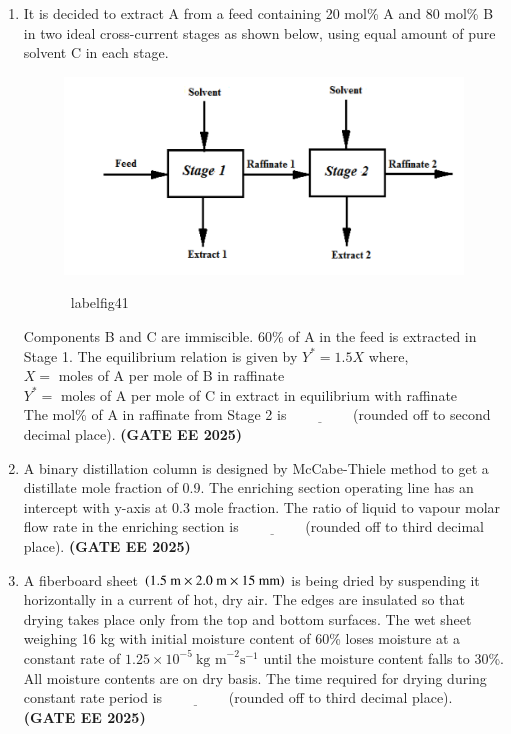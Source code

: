 \documentclass[journal,12pt,onecolumn]{IEEEtran}
\theoremstyle{remark}
\begin{document}
\begin{enumerate}
\item It is decided to extract A from a feed containing 20 mol\% A and 80 mol\% B in two ideal cross-current stages as shown below, using equal amount of pure solvent C in each stage.
	\begin{figure}
\begin{center}
\includegraphics[width=0.8\columnwidth]{figs/41.png}
     \caption{}
      \ label{fig41}
\end{center}
	\end{figure}
Components B and C are immiscible. 60\% of A in the feed is extracted in Stage 1. The equilibrium relation is given by $Y^{*}=1.5 X$ where, \\
$X=$ moles of A per mole of B in raffinate \\
$Y^{*}=$ moles of A per mole of C in extract in equilibrium with raffinate
\\
The mol\% of A in raffinate from Stage 2 is$\underline{\hspace{2cm}}$(rounded off to second decimal place). \hfill \textbf{(GATE EE 2025)} 



\item A binary distillation column is designed by McCabe-Thiele method to get a distillate mole fraction of 0.9. The enriching section operating line has an intercept with y-axis at 0.3 mole fraction. The ratio of liquid to vapour molar flow rate in the enriching section is$\underline{\hspace{2cm}}$(rounded off to third decimal place). \hfill \textbf{(GATE EE 2025)} 



\item A fiberboard sheet $\brak{1.5~\text{m}\times2.0~\text{m}\times15~\text{mm}}$ is being dried by suspending it horizontally in a current of hot, dry air. The edges are insulated so that drying takes place only from the top and bottom surfaces. The wet sheet weighing 16 kg with initial moisture content of 60\% loses moisture at a constant rate of $1.25\times10^{-5}~\text{kg m}^{-2}\text{s}^{-1}$ until the moisture content falls to 30\%. All moisture contents are on dry basis. The time required for drying during constant rate period  is$\underline{\hspace{2cm}}$(rounded off to third decimal place). \hfill \textbf{(GATE EE 2025)} 




\end{enumerate}
\end{document}

